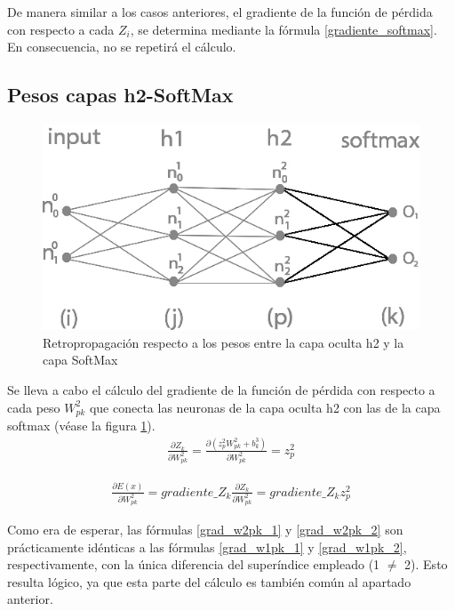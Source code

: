 De manera similar a los casos anteriores, el gradiente de la función de pérdida con respecto a cada $Z_i$, se determina mediante la fórmula \ref{gradiente_softmax}. En consecuencia, no se repetirá el cálculo. \\

\subsection{Pesos capas h2-SoftMax}

\begin{figure}[H]
	\centering
	\includegraphics[scale=0.35]{imagenes/nn_2_capa_pesos_h2_output.jpg}  
	\caption{Retropropagación respecto a los pesos entre la capa oculta h2 y la capa SoftMax}
	\label{fig:nn_2_capa_pesos_h2_output}
\end{figure}

Se lleva a cabo el cálculo del gradiente de la función de pérdida con respecto a cada peso $W^2_{pk}$ que conecta las neuronas de la capa oculta h2 con las de la capa softmax (véase la figura \ref{fig:nn_2_capa_pesos_h2_output}). \\

\begin{gather}
	\frac{\partial Z_k}{\partial W^2_{pk}} = \frac{\partial (z^2_p   W^2 _{pk} + b^3_k)}{\partial W^2_{pk }} = z^2_p 
	\label{grad_w2pk_1}
\end{gather}

\begin{gather}
	\frac{\partial E(x)}{\partial W^2_{pk }} =  gradiente\_Z_k   \frac{\partial Z_k}{\partial W^2_{pk }} = gradiente\_Z_k   z^2_p
	\label{grad_w2pk_2}
\end{gather}

Como era de esperar, las fórmulas \ref{grad_w2pk_1} y \ref{grad_w2pk_2} son prácticamente idénticas a las fórmulas \ref{grad_w1pk_1} y \ref{grad_w1pk_2}, respectivamente, con la única diferencia del superíndice empleado (1 $\neq$ 2). Esto resulta lógico, ya que esta parte del cálculo es también común al apartado anterior.

